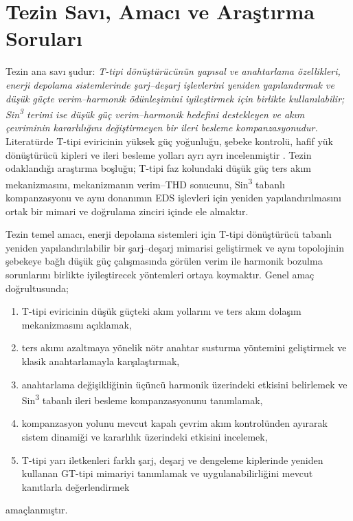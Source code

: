 \section{Tezin Savı, Amacı ve Araştırma Soruları}
\label{sec:giris-amac}

Tezin ana savı şudur: \emph{T-tipi dönüştürücünün yapısal ve anahtarlama özellikleri, enerji depolama sistemlerinde şarj--deşarj işlevlerini yeniden yapılandırmak ve düşük güçte verim--harmonik ödünleşimini iyileştirmek için birlikte kullanılabilir; Sin\textsuperscript{3} terimi ise düşük güç verim--harmonik hedefini destekleyen ve akım çevriminin kararlılığını değiştirmeyen bir ileri besleme kompanzasyonudur.} Literatürde T-tipi eviricinin yüksek güç yoğunluğu, şebeke kontrolü, hafif yük dönüştürücü kipleri ve ileri besleme yolları ayrı ayrı incelenmiştir \citep{Blaabjerg2006,Wang2020,Chen2010,Lu2016}. Tezin odaklandığı araştırma boşluğu; T-tipi faz kolundaki düşük güç ters akım mekanizmasını, mekanizmanın verim--THD sonucunu, Sin\textsuperscript{3} tabanlı kompanzasyonu ve aynı donanımın EDS işlevleri için yeniden yapılandırılmasını ortak bir mimari ve doğrulama zinciri içinde ele almaktır.

Tezin temel amacı, enerji depolama sistemleri için T-tipi dönüştürücü tabanlı yeniden yapılandırılabilir bir şarj--deşarj mimarisi geliştirmek ve aynı topolojinin şebekeye bağlı düşük güç çalışmasında görülen verim ile harmonik bozulma sorunlarını birlikte iyileştirecek yöntemleri ortaya koymaktır. Genel amaç doğrultusunda;

\begin{enumerate}
  \item T-tipi eviricinin düşük güçteki akım yollarını ve ters akım dolaşım mekanizmasını açıklamak,
  \item ters akımı azaltmaya yönelik nötr anahtar susturma yöntemini geliştirmek ve klasik anahtarlamayla karşılaştırmak,
  \item anahtarlama değişikliğinin üçüncü harmonik üzerindeki etkisini belirlemek ve Sin\textsuperscript{3} tabanlı ileri besleme kompanzasyonunu tanımlamak,
  \item kompanzasyon yolunu mevcut kapalı çevrim akım kontrolünden ayırarak sistem dinamiği ve kararlılık üzerindeki etkisini incelemek,
  \item T-tipi yarı iletkenleri farklı şarj, deşarj ve dengeleme kiplerinde yeniden kullanan GT-tipi mimariyi tanımlamak ve uygulanabilirliğini mevcut kanıtlarla değerlendirmek
\end{enumerate}
amaçlanmıştır.

